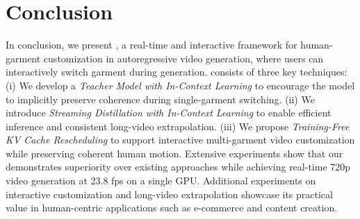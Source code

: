 \section{Conclusion}
%
In conclusion, we present \textbf{\method}, a real-time and interactive framework for human-garment customization in autoregressive video generation, where users can interactively switch garment during generation.
% 
\method consists of three key techniques:
% 
(i) We develop a \textit{Teacher Model with In-Context Learning}  to encourage the model to implicitly preserve coherence during single-garment switching.
(ii) We introduce \textit{Streaming Distillation with In-Context Learning} to enable efficient inference and consistent long-video extrapolation.
(iii) We propose \textit{Training-Free KV Cache Rescheduling} to support interactive multi-garment video customization while preserving coherent human motion.
% 
Extensive experiments show that our \method demonstrates superiority over existing approaches while achieving real-time 720p video generation at 23.8 fps on a single GPU. 
Additional experiments on interactive customization and long-video extrapolation showcase its practical value in human-centric applications such as e-commerce and content creation.
